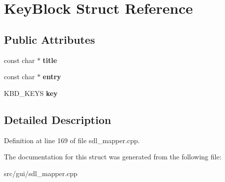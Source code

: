 \hypertarget{structKeyBlock}{\section{Key\-Block Struct Reference}
\label{structKeyBlock}
}
\subsection*{Public Attributes}
\begin{DoxyCompactItemize}
\item 
\hypertarget{structKeyBlock_aa8f0583008d486e791f4712f7206c256}{const char $\ast$ {\bfseries title}}\label{structKeyBlock_aa8f0583008d486e791f4712f7206c256}

\item 
\hypertarget{structKeyBlock_a025404788705e95fb7d9484ee068dd50}{const char $\ast$ {\bfseries entry}}\label{structKeyBlock_a025404788705e95fb7d9484ee068dd50}

\item 
\hypertarget{structKeyBlock_ad7f402307cea47b73666058183ded837}{K\-B\-D\-\_\-\-K\-E\-Y\-S {\bfseries key}}\label{structKeyBlock_ad7f402307cea47b73666058183ded837}

\end{DoxyCompactItemize}


\subsection{Detailed Description}


Definition at line 169 of file sdl\-\_\-mapper.\-cpp.



The documentation for this struct was generated from the following file\-:\begin{DoxyCompactItemize}
\item 
src/gui/sdl\-\_\-mapper.\-cpp\end{DoxyCompactItemize}
